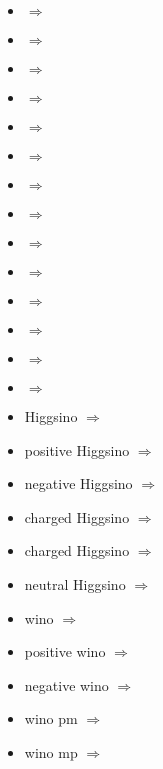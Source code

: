 \begin{multicols}{2}
{\begin{itemize}
\item  {} $\Rightarrow$ \PLpm
\item  {} $\Rightarrow$ \PLmp
\item  {} $\Rightarrow$ \PLz
\item  {} $\Rightarrow$ \Paii
\item  {} $\Rightarrow$ \Pai
\item  {} $\Rightarrow$ \Paz
\item  {} $\Rightarrow$ \Pbgcia
\item  {} $\Rightarrow$ \Pbgciia
\item  {} $\Rightarrow$ \Pbgcii
\item  {} $\Rightarrow$ \Pbgci
\item  {} $\Rightarrow$ \Pbgcza
\item  {} $\Rightarrow$ \Pbgcz
\item  {} $\Rightarrow$ \Pbi
\item  {} $\Rightarrow$ \Phia
\item Higgsino\newline {} $\Rightarrow$ \PSH
\item positive Higgsino\newline {} $\Rightarrow$ \PSHp
\item negative Higgsino\newline {} $\Rightarrow$ \PSHm
\item charged Higgsino\newline {} $\Rightarrow$ \PSHpm
\item charged Higgsino\newline {} $\Rightarrow$ \PSHmp
\item neutral Higgsino\newline {} $\Rightarrow$ \PSHz
\item wino\newline {} $\Rightarrow$ \PSW
\item positive wino\newline {} $\Rightarrow$ \PSWp
\item negative wino\newline {} $\Rightarrow$ \PSWm
\item wino pm\newline {} $\Rightarrow$ \PSWpm
\item wino mp\newline {} $\Rightarrow$ \PSWmp

\end{itemize}}
\end{multicols}
